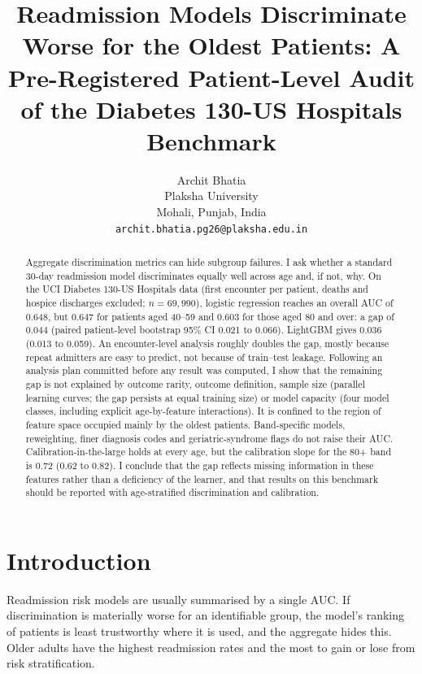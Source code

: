 \documentclass{article}
\title{Readmission Models Discriminate Worse for the Oldest Patients: A Pre-Registered Patient-Level Audit of the Diabetes 130-US Hospitals Benchmark}
\author{
  Archit Bhatia \\
  Plaksha University\\
  Mohali, Punjab, India \\
  \texttt{archit.bhatia.pg26@plaksha.edu.in}
}
\date{}
\begin{document}
\maketitle

\begin{abstract}
Aggregate discrimination metrics can hide subgroup failures. I ask whether a standard 30-day readmission model discriminates equally well across age and, if not, why. On the UCI Diabetes 130-US Hospitals data (first encounter per patient, deaths and hospice discharges excluded; $n = 69{,}990$), logistic regression reaches an overall AUC of 0.648, but 0.647 for patients aged 40--59 and 0.603 for those aged 80 and over: a gap of 0.044 (paired patient-level bootstrap 95\% CI 0.021 to 0.066). LightGBM gives 0.036 (0.013 to 0.059). An encounter-level analysis roughly doubles the gap, mostly because repeat admitters are easy to predict, not because of train--test leakage. Following an analysis plan committed before any result was computed, I show that the remaining gap is not explained by outcome rarity, outcome definition, sample size (parallel learning curves; the gap persists at equal training size) or model capacity (four model classes, including explicit age-by-feature interactions). It is confined to the region of feature space occupied mainly by the oldest patients. Band-specific models, reweighting, finer diagnosis codes and geriatric-syndrome flags do not raise their AUC. Calibration-in-the-large holds at every age, but the calibration slope for the 80+ band is 0.72 (0.62 to 0.82). I conclude that the gap reflects missing information in these features rather than a deficiency of the learner, and that results on this benchmark should be reported with age-stratified discrimination and calibration.
\end{abstract}


\section{Introduction}

Readmission risk models are usually summarised by a single AUC. If discrimination is materially worse for an identifiable group, the model's ranking of patients is least trustworthy where it is used, and the aggregate hides this. Older adults have the highest readmission rates and the most to gain or lose from risk stratification.
\end{document}
